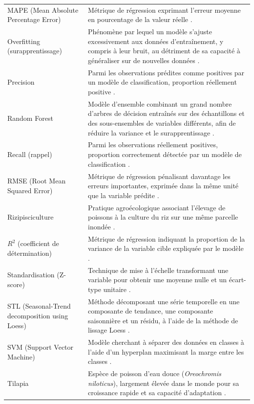 \documentclass[a4paper,12pt, oneside]{article}
\begin{document}
\begin{longtable}{@{}p{4cm}p{13cm}@{}}
MAPE (Mean Absolute Percentage Error) & Métrique de régression exprimant l'erreur moyenne en pourcentage de la valeur réelle \cite{fpp3}. \\[24pt]
Overfitting (surapprentissage) & Phénomène par lequel un modèle s'ajuste excessivement aux données d'entraînement, y compris à leur bruit, au détriment de sa capacité à généraliser sur de nouvelles données \cite{scikitlearn}. \\[24pt]
Precision & Parmi les observations prédites comme positives par un modèle de classification, proportion réellement positive \cite{scikitlearn}. \\[36pt]
Random Forest & Modèle d'ensemble combinant un grand nombre d'arbres de décision entraînés sur des échantillons et des sous-ensembles de variables différents, afin de réduire la variance et le surapprentissage \cite{breiman2001}. \\[24pt]
Recall (rappel) & Parmi les observations réellement positives, proportion correctement détectée par un modèle de classification \cite{scikitlearn}. \\[24pt]
RMSE (Root Mean Squared Error) & Métrique de régression pénalisant davantage les erreurs importantes, exprimée dans la même unité que la variable prédite \cite{fpp3}. \\[24pt]
Rizipisciculture & Pratique agroécologique associant l'élevage de poissons à la culture du riz sur une même parcelle inondée \cite{apdra2023}. \\[24pt]
$R^2$ (coefficient de détermination) & Métrique de régression indiquant la proportion de la variance de la variable cible expliquée par le modèle \cite{scikitlearn}. \\[24pt]
Standardisation (Z-score) & Technique de mise à l'échelle transformant une variable pour obtenir une moyenne nulle et un écart-type unitaire \cite{scikitlearn}. \\[24pt]
STL (Seasonal-Trend decomposition using Loess) & Méthode décomposant une série temporelle en une composante de tendance, une composante saisonnière et un résidu, à l'aide de la méthode de lissage Loess \cite{cleveland1990,statsmodelsdoc}. \\[36pt]
SVM (Support Vector Machine) & Modèle cherchant à séparer des données en classes à l'aide d'un hyperplan maximisant la marge entre les classes \cite{cortesvapnik1995}. \\[36pt]
Tilapia & Espèce de poisson d'eau douce (\textit{Oreochromis niloticus}), largement élevée dans le monde pour sa croissance rapide et sa capacité d'adaptation \cite{faotilapia}. \\[24pt]

\end{longtable}
\end{document}
